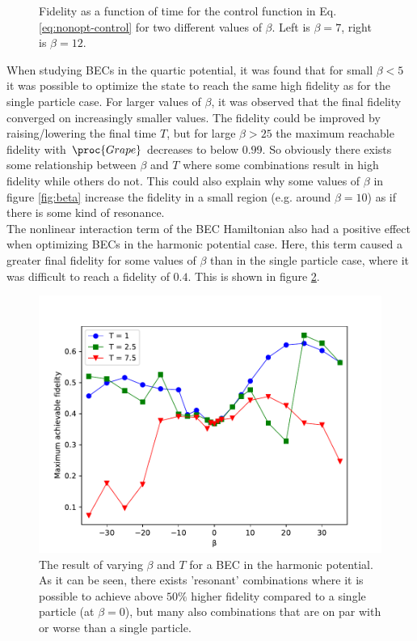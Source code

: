 \documentclass[a4paper, twocolumn]{revtex4-1}
\begin{document}
\begin{figure}
\begin{subfigure}{0.45\columnwidth}
	\end{subfigure}
	\caption{Fidelity as a function of time for the control function in Eq. \eqref{eq:nonopt-control} for two different values of $\beta$. Left is $\beta=7$, right is $\beta=12$.}
	\label{fig:fidelityplot}
\end{figure}

When studying BECs in the quartic potential, it was found that for small $\beta<5$ it was possible to optimize the state to reach the same high fidelity as for the single particle case. For larger values of $\beta$, it was observed that the final fidelity converged on increasingly smaller values. The fidelity could be improved by raising/lowering the final time $T$, but for large $\beta > 25$ the maximum reachable fidelity with $\proc{Grape}$ decreases to below $0.99$. So obviously there exists some relationship between $\beta$ and $T$ where some combinations result in high fidelity while others do not. This could also explain why some values of $\beta$ in figure \ref{fig:beta} increase the fidelity in a small region (e.g. around $\beta=10$) as if there is some kind of resonance. \\

The nonlinear interaction term of the BEC Hamiltonian also had a positive effect when optimizing BECs in the harmonic potential case. Here, this term caused a greater final fidelity for some values of $\beta$ than in the single particle case, where it was difficult to reach a fidelity of $0.4$. This is shown in figure \ref{fig:HO}.\\
\begin{figure}[h]
	\includegraphics[width=\columnwidth]{graphics/exploration/betaTHO.pdf}
	\caption{The result of varying $\beta$ and $T$ for a BEC in the harmonic potential. As it can be seen, there exists 'resonant' combinations where it is possible to achieve above $50\%$ higher fidelity compared to a single particle (at $\beta=0$), but many also combinations that are on par with or worse than a single particle.}
	\label{fig:HO}
\end{figure}
\end{document}
